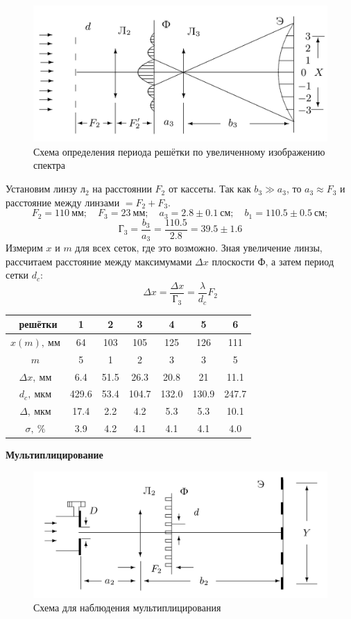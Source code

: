 \documentclass[10pt, a4paper]{article}
\begin{document}
\begin{figure}[H]
	\includegraphics[width = 1.0\linewidth]{3.png}
	\caption*{Схема определения периода решётки по увеличенному изображению спектра}
\end{figure}
Установим линзу $л_2$ на расстоянии $F_2$ от кассеты. Так как $b_3 \gg a_3$, то $a_3 \approx F_3$ и расстояние между линзами $= F_2 + F_3$. 
\[
F_2 = 110\ мм; \quad F_3 = 23\ мм; \quad a_3 = 2.8 \pm 0.1\ см; \quad b_1 = 110.5 \pm 0.5\ см;
\]
\[
	Г_3 = \frac{b_3}{a_3} = \frac{110.5}{2.8} = 39.5 \pm 1.6
\]
Измерим $x$ и $m$ для всех сеток, где это возможно. Зная увеличение линзы, рассчитаем расстояние между максимумами $\Delta x$ плоскости Ф, а затем период сетки $d_c$:
\[
	\Delta x = \frac{\Delta x}{Г_3} = \frac{\lambda}{d_c} F_2
\]
\begin{table}[H]
	\centering
	\begin{tabular}{|c|c|c|c|c|c|c|}  \hline
	\textnumero\ решётки & 1 & 2 & 3 & 4 & 5 & 6 \\\hline
	$x(m),\ мм$ & 64 & 103 & 105 & 125 & 126 & 111 \\\hline
	$m$ & 5 & 1 & 2 & 3 & 3 & 5 \\\hline
	$\Delta x,\ мм$ & 6.4 & 51.5 & 26.3 & 20.8 & 21 & 11.1 \\\hline
	$d_c,\ мкм$ & 429.6 & 53.4 & 104.7 & 132.0 & 130.9 & 247.7 \\\hline
	$\Delta,\ мкм$ & 17.4 & 2.2 & 4.2 & 5.3 & 5.3 & 10.1 \\\hline
	$\sigma,\ \%$ & 3.9 & 4.2 & 4.1 & 4.1 & 4.1 & 4.0 \\\hline
	\end{tabular}
	\end{table}
\textbf{Мультиплицирование}
\begin{figure}[H]
	\includegraphics[width = 1.0\linewidth]{4.png}
	\caption*{Схема для наблюдения мультиплицирования}
\end{figure}	
\end{document}
